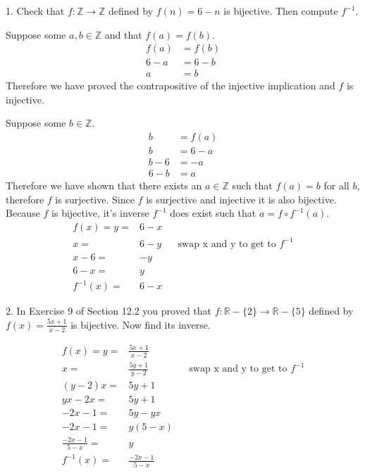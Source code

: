 \documentclass{idrisMemo}
\begin{document}
\toc
\thispagestyle{styleTOC}
\pagebreak
\pagestyle{styleE}

\begin{prooflist}{1. Check that $f: \mathbb{Z} \rightarrow \mathbb{Z}$ defined
    by $f(n)=6-n$ is bijective. Then compute $f^{-1}$.}
\inj{}
\item Suppose some $a, b \in \mathbb{Z}$ and that $f(a) = f(b)$.
\begin{align*}
    f(a)&=f(b)\\
    6-a&=6-b\\
    a&=b
\end{align*}
Therefore we have proved the contrapositive of the injective implication and $f$
is injective.
\surj{}
\item Suppose some $b\in \mathbb{Z}$.
\begin{align*}
    b&=f(a)\\
    b&=6-a\\
    b-6&=-a\\
    6-b&=a
\end{align*}
Therefore we have shown that there exists an $a\in\mathbb{Z}$ such that $f(a)=b$
for all $b$, therefore $f$ is surjective. Since $f$ is surjective and injective
it is also bijective. Because $f$ is bijective, it's inverse $f^{-1}$ does exist
such that $a=f\circ f^{-1}(a)$.
\begin{align*}
    f(x)=y=&6-x\\
    x=&6-y&&\text{swap x and y to get to }f^{-1}\\
    x-6=&-y\\
    6-x=&y\\
    f^{-1}(x)=&6-x
\end{align*}
\end{prooflist}

\begin{prooflist}{2. In Exercise 9 of Section 12.2 you proved that $f:
    \mathbb{R}-\{2\} \rightarrow \mathbb{R}-\{5\}$ defined by $f(x)=\frac{5
x+1}{x-2}$ is bijective. Now find its inverse.}
\item
\begin{align*}
    f(x)=y=&\frac{5 x+1}{x-2}\\
    x=&\frac{5y+1}{y-2}&&\text{swap x and y to get to }f^{-1}\\
    (y-2)x=&5y+1\\
    yx-2x=&5y+1\\
    -2x-1=&5y-yx\\
    -2x-1=&y(5-x)\\
    \frac{-2x-1}{5-x}=&y\\
    f^{-1}(x) =& \frac{-2x-1}{5-x}
\end{align*}
\end{prooflist}
\end{document}
